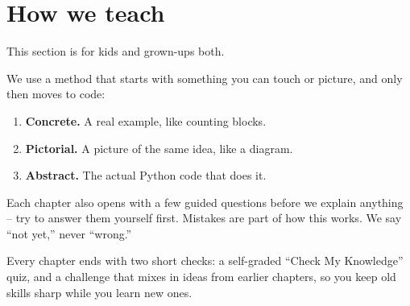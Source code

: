 \section{How we teach}

This section is for kids and grown-ups both.

We use a method that starts with something you can touch or picture, and
only then moves to code:

\begin{enumerate}
  \item \textbf{Concrete.} A real example, like counting blocks.
  \item \textbf{Pictorial.} A picture of the same idea, like a diagram.
  \item \textbf{Abstract.} The actual Python code that does it.
\end{enumerate}

Each chapter also opens with a few guided questions before we explain
anything -- try to answer them yourself first. Mistakes are part of how
this works. We say ``not yet,'' never ``wrong.''

Every chapter ends with two short checks: a self-graded ``Check My
Knowledge'' quiz, and a challenge that mixes in ideas from earlier
chapters, so you keep old skills sharp while you learn new ones.
